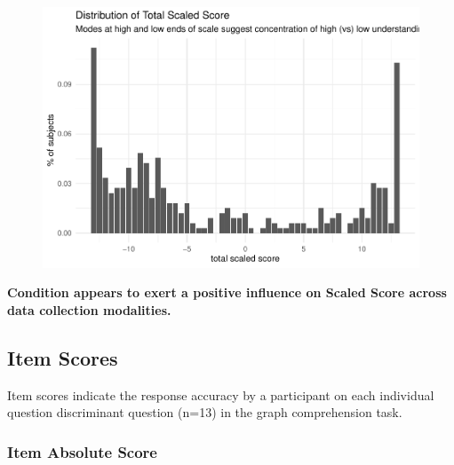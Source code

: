 \documentclass[
  letterpaper,
  DIV=11,
  numbers=noendperiod]{scrreprt}
\begin{document}
\begin{figure}[H]

{\centering \includegraphics{analysis/SGC3A/3_sgc3A_description_files/figure-pdf/VIS-SUBJ-SCALED-1.pdf}

}

\end{figure}

\begin{tcolorbox}[standard jigsaw,colframe=quarto-callout-color-frame, arc=.35mm, titlerule=0mm, toptitle=1mm, bottomtitle=1mm, rightrule=.15mm, title={Decision}, leftrule=.75mm, toprule=.15mm, bottomrule=.15mm, opacityback=0, colbacktitle=quarto-callout-color!10!white, left=2mm, opacitybacktitle=0.6, coltitle=black, colback=white]
\textbf{Condition appears to exert a positive influence on Scaled Score
across data collection modalities.}
\end{tcolorbox}

\hypertarget{item-scores}{%
\subsection{Item Scores}\label{item-scores}}

Item scores indicate the response accuracy by a participant on each
individual question discriminant question (n=13) in the graph
comprehension task.

\hypertarget{item-absolute-score}{%
\subsubsection{Item Absolute Score}\label{item-absolute-score}}
\end{document}

